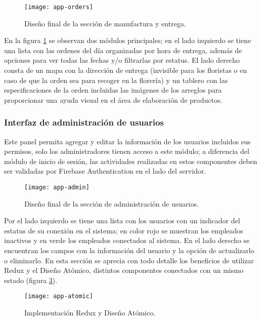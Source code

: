 \begin{figure}[H]
  \centering
  \texttt{[image: app-orders]}
  \caption{Diseño final de la sección de manufactura y entrega.}
  \label{production-ui}
\end{figure}

En la figura \ref{production-ui} se observan dos módulos principales; en el lado izquierdo se tiene una lista con las ordenes del día organizadas por hora de entrega, además de opciones para ver todas las fechas y/o filtrarlas por estatus. El lado derecho consta de un mapa con la dirección de entrega (invisible para los floristas o en caso de que la orden sea para recoger en la florería) y un tablero con las especificaciones de la orden incluidas las imágenes de los arreglos para proporcionar una ayuda visual en el área de elaboración de productos.
\vspace{0.8cm}

\subsubsection{Interfaz de administración de usuarios}
Este panel permita agregar y editar la información de los usuarios incluidos sus permisos, solo los administradores tienen acceso a este módulo; a diferencia del módulo de inicio de sesión, las actividades realizadas en estos componentes deben ser validadas por Firebase Authentication en el lado del servidor.
\vspace{0.8cm}

\begin{figure}[H]
  \centering
  \texttt{[image: app-admin]}
  \caption{Diseño final de la sección de administración de usuarios.}
  \label{admin-ui}
\end{figure}

Por el lado izquierdo se tiene una lista con los usuarios con un indicador del estatus de su conexión en el sistema; en color rojo se muestran los empleados inactivos y en verde los empleados conectados al sistema. En el lado derecho se encuentran los campos con la información del usuario y la opción de actualizarlo o eliminarlo. En esta sección se aprecia con todo detalle los beneficios de utilizar Redux y el Diseño Atómico, distintos componentes conectados con un mismo estado (figura \ref{admin-atomic}).
\vspace{0.8cm}

\begin{figure}[H]
  \centering
  \texttt{[image: app-atomic]}
  \caption{Implementación Redux y Diseño Atómico.}
  \label{admin-atomic}
\end{figure}
